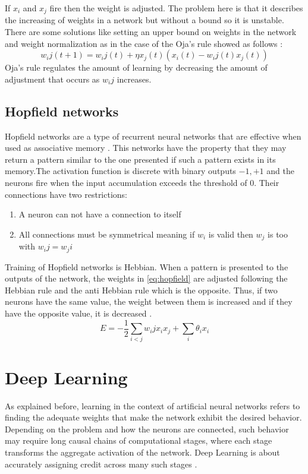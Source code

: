 If $x_i$ and $x_j$ fire then the weight is adjusted. The problem here is that it describes the increasing of weights in a network but without a bound so it is unstable. There are some solutions like setting an upper bound on weights in the network and weight normalization as in the case of the Oja's rule showed as follows \cite{oja1982simplified}:
\begin{equation}
\label{eq:ojasrule}
w_ij (t+1)= w_ij(t)+\eta x_j(t)(x_i(t) - w_ij(t)x_j(t))
\end{equation}
Oja's rule regulates the amount of learning by decreasing the amount of adjustment that occurs as $w_ij$ increases.

\subsection{Hopfield networks}
Hopfield networks are a type of recurrent neural networks that are effective when used as associative memory \cite{hopfield1982neural}. This networks have the property that they may return a pattern similar to the one presented if such a pattern exists in its memory.The activation function is discrete with binary outputs ${-1,+1}$ and the neurons fire when the input accumulation exceeds the threshold of 0. Their connections have two restrictions:
\begin{enumerate}
\item A neuron can not have a connection to itself
\item All connections must be symmetrical meaning if $w_i$ is valid then $w_j$ is too with $w_ij=w_ji$
\end{enumerate}
Training of Hopfield networks is Hebbian. When a pattern is presented to the outputs of the network, the weights in \ref{eq:hopfield} are adjusted following the Hebbian rule and the anti Hebbian rule which is the opposite. Thus, if two neurons have the same value, the weight between them is increased and if they have the opposite value, it is decreased \cite{strom2007hebbian}.
\begin{equation}
\label{eq:hopfield}
E= -\frac{1}{2} \sum_{i<j} w_ij x_i x_j + \sum_i \theta_i x_i
\end{equation}

\section{Deep Learning}
As explained before, learning in the context of artificial neural networks refers to finding the adequate weights that make the network exhibit the desired behavior. Depending on the problem and how the neurons are connected, such behavior may require long causal chains of computational stages, where each stage transforms the aggregate activation of the network. Deep Learning is about accurately assigning credit across many such stages \cite{schmidhuber2015deep}.

